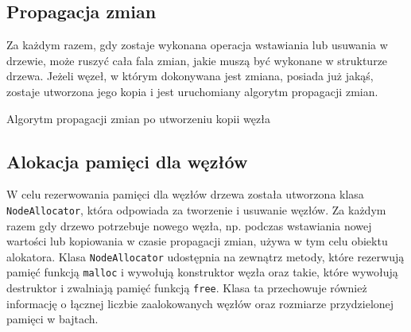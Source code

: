 \documentclass[a4paper,twoside]{article}
\begin{document}
	\subsection{Propagacja zmian}
	Za każdym razem, gdy zostaje wykonana operacja wstawiania lub usuwania w drzewie, może ruszyć cała fala zmian, jakie muszą być wykonane w strukturze drzewa. Jeżeli węzeł, w którym dokonywana jest zmiana, posiada już jakąś, zostaje utworzona jego kopia i jest uruchomiany algorytm propagacji zmian.
	\begin{algorithm}[H]
		\caption{Algorytm propagacji zmian po utworzeniu kopii węzła}\label{propadacjaZmianAlgo}
		\begin{algorithmic}
					\Else
						\Else
						\EndIf
					\EndIf
				\EndWhile
			\EndProcedure
		\end{algorithmic}
	\end{algorithm}
	\subsection{Alokacja pamięci dla węzłów}
	W celu rezerwowania pamięci dla węzłów drzewa została utworzona klasa \lstinline|NodeAllocator|, która odpowiada za tworzenie i usuwanie węzłów. Za każdym razem gdy drzewo potrzebuje nowego węzła, np. podczas wstawiania nowej wartości lub kopiowania w czasie propagacji zmian, używa w tym celu obiektu alokatora. Klasa \lstinline|NodeAllocator| udostępnia na zewnątrz metody, które rezerwują pamięć funkcją \lstinline|malloc| i wywołują konstruktor węzła oraz takie, które wywołują destruktor i zwalniają pamięć funkcją \lstinline|free|. Klasa ta przechowuje również informację o łącznej liczbie zaalokowanych węzłów oraz rozmiarze przydzielonej pamięci w bajtach.
\end{document}
